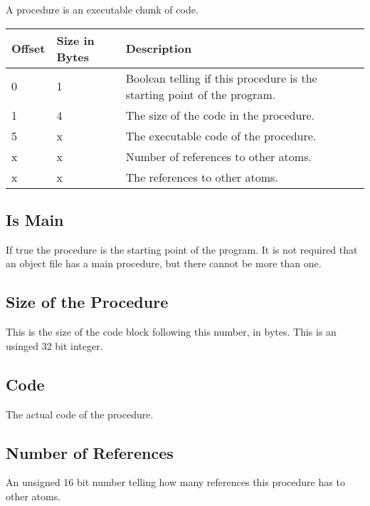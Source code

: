 A procedure is an executable chunk of code.

\begin{table}[h]
    \centering
    \label{tbl:procedure}
    \begin{tabular}{|l|l|l|}
        \hline
        \textbf{Offset} & \textbf{Size in Bytes} & \textbf{Description}                                                    \\ \hline
        0               & 1                      & Boolean telling if this procedure is the starting point of the program. \\ \hline
        1               & 4                      & The size of the code in the procedure.                                  \\ \hline
        5               & x                      & The executable code of the procedure.                                   \\ \hline
        x               & x                      & Number of references to other atoms.                                    \\ \hline
        x               & x                      & The references to other atoms.                                          \\ \hline
    \end{tabular}
\end{table}

\subsection{Is Main}
If true the procedure is the starting point of the program. It is not required 
that an object file has a main procedure, but there cannot be more than one.

\subsection{Size of the Procedure}
This is the size of the code block following this number, in bytes. This is an
usinged 32 bit integer.

\subsection{Code}
The actual code of the procedure.

\subsection{Number of References}
An unsigned 16 bit number telling how many references this procedure has to 
other atoms.

